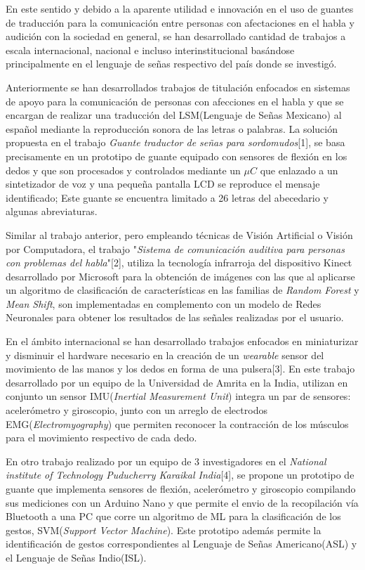 \hfill \break
\justifying
En este sentido y debido a la aparente utilidad e innovación en el uso de guantes de traducción para la comunicación entre personas con afectaciones en el habla y audición con la sociedad en general, se han desarrollado cantidad de trabajos a escala internacional, nacional e incluso interinstitucional basándose principalmente en el lenguaje de señas respectivo del país donde se investigó.

%
%
\hfill \break
\justifying
Anteriormente se han desarrollados trabajos de titulación enfocados en sistemas de apoyo para la comunicación de personas con afecciones en el habla y que se encargan de realizar una traducción del LSM(Lenguaje de Señas Mexicano) al español mediante la reproducción sonora de las letras o palabras. La solución propuesta en el trabajo \textit{Guante traductor de señas para sordomudos}[1], se basa precisamente en un prototipo de guante equipado con sensores de flexión en los dedos y que son procesados y controlados mediante un $\mu C$ que enlazado a un sintetizador de voz y una pequeña pantalla LCD se reproduce el mensaje identificado; Este guante se encuentra limitado a 26 letras del abecedario y algunas abreviaturas.

\hfill \break
\justifying
Similar al trabajo anterior, pero empleando técnicas de Visión Artificial o Visión por Computadora, el trabajo "\textit{Sistema de comunicación auditiva para personas con problemas del habla}"[2], utiliza la tecnología infrarroja del dispositivo Kinect desarrollado por Microsoft para la obtención de imágenes con las que al aplicarse un algoritmo de clasificación de características en las familias de \textit{Random Forest} y \textit{Mean Shift}, son implementadas en complemento con un modelo de Redes Neuronales para obtener los resultados de las señales realizadas por el usuario.

\hfill \break
\justifying
En el ámbito internacional se han desarrollado trabajos enfocados en miniaturizar y disminuir el hardware necesario en la creación de un \textit{wearable} sensor del movimiento de las manos y los dedos en forma de una pulsera[3]. En este trabajo desarrollado por un equipo de la Universidad de Amrita en la India, utilizan en conjunto un sensor IMU(\textit{Inertial Measurement Unit}) integra un par de sensores: acelerómetro y giroscopio, junto con un arreglo de electrodos EMG(\textit{Electromyography}) que permiten reconocer la contracción de los músculos para el movimiento respectivo de cada dedo.

\hfill \break
\justifying
En otro trabajo realizado por un equipo de 3 investigadores en el \textit{National institute of Technology Puducherry Karaikal India}[4], se propone un prototipo de guante que implementa sensores de flexión, acelerómetro y giroscopio compilando sus mediciones con un Arduino Nano y que permite el envio de la recopilación vía Bluetooth a una PC que corre un algoritmo de ML para la clasificación de los gestos, SVM(\textit{Support Vector Machine}). Este prototipo además permite la identificación de gestos correspondientes al Lenguaje de Señas Americano(ASL) y el Lenguaje de Señas Indio(ISL).

